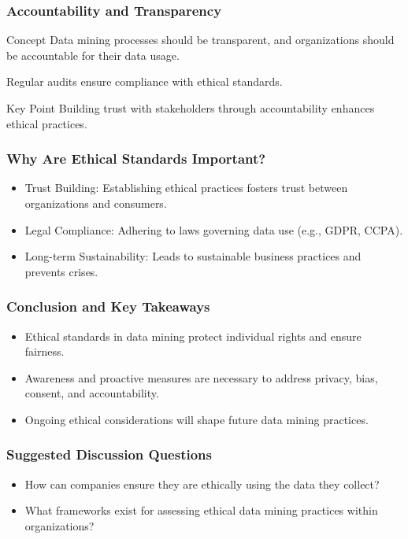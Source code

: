 \documentclass[aspectratio=169]{beamer}
\begin{document}
\begin{frame}[fragile]
    \frametitle{Accountability and Transparency}
    \begin{block}{Concept}
        Data mining processes should be transparent, and organizations should be accountable for their data usage.
    \end{block}
    \begin{example}
        Regular audits ensure compliance with ethical standards.
    \end{example}
    \begin{block}{Key Point}
        Building trust with stakeholders through accountability enhances ethical practices.
    \end{block}
\end{frame}

\begin{frame}[fragile]
    \frametitle{Why Are Ethical Standards Important?}
    \begin{itemize}
        \item Trust Building: Establishing ethical practices fosters trust between organizations and consumers.
        \item Legal Compliance: Adhering to laws governing data use (e.g., GDPR, CCPA).
        \item Long-term Sustainability: Leads to sustainable business practices and prevents crises.
    \end{itemize}
\end{frame}

\begin{frame}[fragile]
    \frametitle{Conclusion and Key Takeaways}
    \begin{itemize}
        \item Ethical standards in data mining protect individual rights and ensure fairness.
        \item Awareness and proactive measures are necessary to address privacy, bias, consent, and accountability.
        \item Ongoing ethical considerations will shape future data mining practices.
    \end{itemize}
\end{frame}

\begin{frame}[fragile]
    \frametitle{Suggested Discussion Questions}
    \begin{itemize}
        \item How can companies ensure they are ethically using the data they collect?
        \item What frameworks exist for assessing ethical data mining practices within organizations?
    \end{itemize}
\end{frame}
\end{document}
